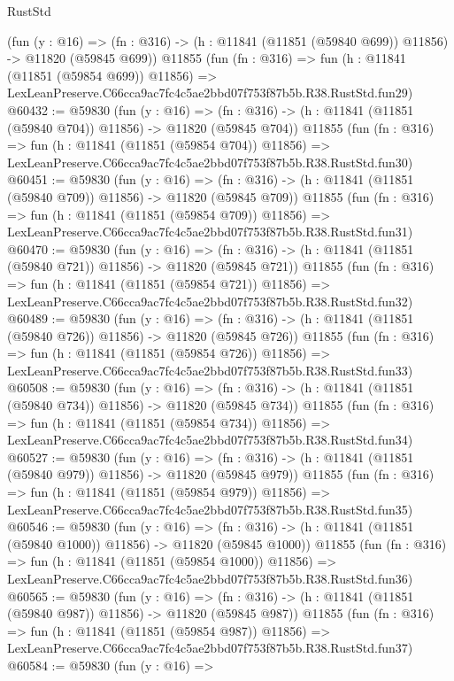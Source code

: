 \begin{lexlean}{RustStd}
\begin{coremodule}
    (fun (y : @16) =>
    (fn : @316) -> (h : @11841 (@11851 (@59840 @699)) @11856) -> @11820 (@59845 @699))
    @11855
    (fun (fn : @316) =>
    fun (h : @11841 (@11851 (@59854 @699)) @11856) =>
    LexLeanPreserve.C66cca9ac7fc4c5ae2bbd07f753f87b5b.R38.RustStd.fun29)
@60432 := @59830
    (fun (y : @16) =>
    (fn : @316) -> (h : @11841 (@11851 (@59840 @704)) @11856) -> @11820 (@59845 @704))
    @11855
    (fun (fn : @316) =>
    fun (h : @11841 (@11851 (@59854 @704)) @11856) =>
    LexLeanPreserve.C66cca9ac7fc4c5ae2bbd07f753f87b5b.R38.RustStd.fun30)
@60451 := @59830
    (fun (y : @16) =>
    (fn : @316) -> (h : @11841 (@11851 (@59840 @709)) @11856) -> @11820 (@59845 @709))
    @11855
    (fun (fn : @316) =>
    fun (h : @11841 (@11851 (@59854 @709)) @11856) =>
    LexLeanPreserve.C66cca9ac7fc4c5ae2bbd07f753f87b5b.R38.RustStd.fun31)
@60470 := @59830
    (fun (y : @16) =>
    (fn : @316) -> (h : @11841 (@11851 (@59840 @721)) @11856) -> @11820 (@59845 @721))
    @11855
    (fun (fn : @316) =>
    fun (h : @11841 (@11851 (@59854 @721)) @11856) =>
    LexLeanPreserve.C66cca9ac7fc4c5ae2bbd07f753f87b5b.R38.RustStd.fun32)
@60489 := @59830
    (fun (y : @16) =>
    (fn : @316) -> (h : @11841 (@11851 (@59840 @726)) @11856) -> @11820 (@59845 @726))
    @11855
    (fun (fn : @316) =>
    fun (h : @11841 (@11851 (@59854 @726)) @11856) =>
    LexLeanPreserve.C66cca9ac7fc4c5ae2bbd07f753f87b5b.R38.RustStd.fun33)
@60508 := @59830
    (fun (y : @16) =>
    (fn : @316) -> (h : @11841 (@11851 (@59840 @734)) @11856) -> @11820 (@59845 @734))
    @11855
    (fun (fn : @316) =>
    fun (h : @11841 (@11851 (@59854 @734)) @11856) =>
    LexLeanPreserve.C66cca9ac7fc4c5ae2bbd07f753f87b5b.R38.RustStd.fun34)
@60527 := @59830
    (fun (y : @16) =>
    (fn : @316) -> (h : @11841 (@11851 (@59840 @979)) @11856) -> @11820 (@59845 @979))
    @11855
    (fun (fn : @316) =>
    fun (h : @11841 (@11851 (@59854 @979)) @11856) =>
    LexLeanPreserve.C66cca9ac7fc4c5ae2bbd07f753f87b5b.R38.RustStd.fun35)
@60546 := @59830
    (fun (y : @16) =>
    (fn : @316) -> (h : @11841 (@11851 (@59840 @1000)) @11856) -> @11820 (@59845 @1000))
    @11855
    (fun (fn : @316) =>
    fun (h : @11841 (@11851 (@59854 @1000)) @11856) =>
    LexLeanPreserve.C66cca9ac7fc4c5ae2bbd07f753f87b5b.R38.RustStd.fun36)
@60565 := @59830
    (fun (y : @16) =>
    (fn : @316) -> (h : @11841 (@11851 (@59840 @987)) @11856) -> @11820 (@59845 @987))
    @11855
    (fun (fn : @316) =>
    fun (h : @11841 (@11851 (@59854 @987)) @11856) =>
    LexLeanPreserve.C66cca9ac7fc4c5ae2bbd07f753f87b5b.R38.RustStd.fun37)
@60584 := @59830
    (fun (y : @16) =>

\end{coremodule}
\end{lexlean}
